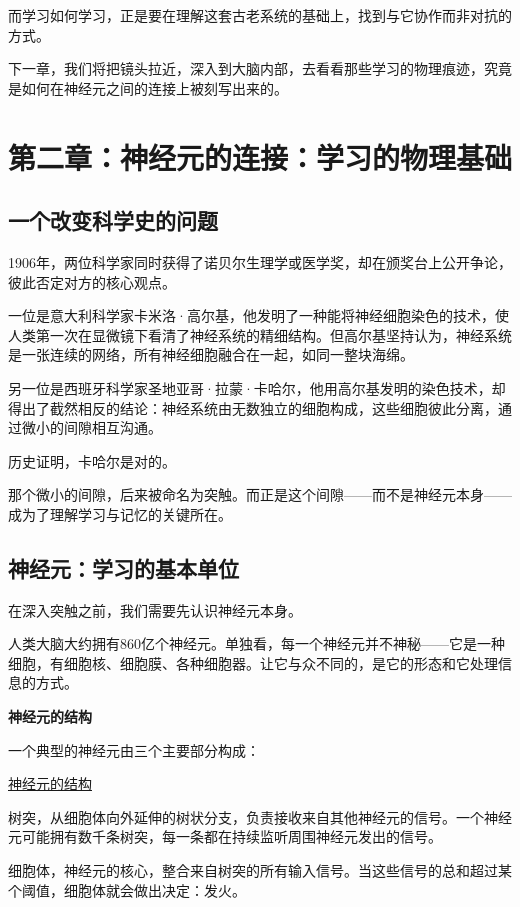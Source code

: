 \documentclass[11pt]{article}
\begin{document}
而学习如何学习，正是要在理解这套古老系统的基础上，找到与它协作而非对抗的方式。

下一章，我们将把镜头拉近，深入到大脑内部，去看看那些学习的物理痕迹，究竟是如何在神经元之间的连接上被刻写出来的。
\section{第二章：神经元的连接：学习的物理基础}
\label{sec:org3dac0a9}

\subsection{一个改变科学史的问题}
\label{sec:org0557a4c}

1906年，两位科学家同时获得了诺贝尔生理学或医学奖，却在颁奖台上公开争论，彼此否定对方的核心观点。

一位是意大利科学家卡米洛·高尔基，他发明了一种能将神经细胞染色的技术，使人类第一次在显微镜下看清了神经系统的精细结构。但高尔基坚持认为，神经系统是一张连续的网络，所有神经细胞融合在一起，如同一整块海绵。

另一位是西班牙科学家圣地亚哥·拉蒙·卡哈尔，他用高尔基发明的染色技术，却得出了截然相反的结论：神经系统由无数独立的细胞构成，这些细胞彼此分离，通过微小的间隙相互沟通。

历史证明，卡哈尔是对的。

那个微小的间隙，后来被命名为突触。而正是这个间隙——而不是神经元本身——成为了理解学习与记忆的关键所在。
\subsection{神经元：学习的基本单位}
\label{sec:orgd6c56f4}

在深入突触之前，我们需要先认识神经元本身。

人类大脑大约拥有860亿个神经元。单独看，每一个神经元并不神秘——它是一种细胞，有细胞核、细胞膜、各种细胞器。让它与众不同的，是它的形态和它处理信息的方式。

\textbf{神经元的结构}

一个典型的神经元由三个主要部分构成：

\href{file:///c:/Users/fupen/org/book/插图/NeuronStructure.png}{神经元的结构}

树突，从细胞体向外延伸的树状分支，负责接收来自其他神经元的信号。一个神经元可能拥有数千条树突，每一条都在持续监听周围神经元发出的信号。

细胞体，神经元的核心，整合来自树突的所有输入信号。当这些信号的总和超过某个阈值，细胞体就会做出决定：发火。
\end{document}
